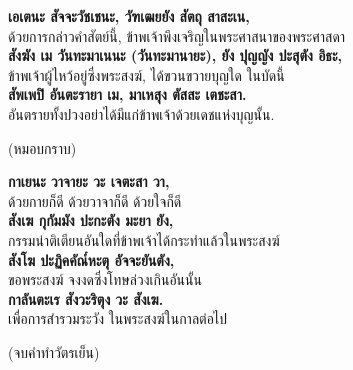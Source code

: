 \documentclass[12pt]{article}
\begin{document}
\textbf{เอเตนะ สัจจะวัชเชนะ, วัฑเฒยยัง สัตถุ สาสะเน,}\\
\indent ด้วยการกล่าวคำสัตย์นี้, ข้าพเจ้าพึงเจริญในพระศาสนาของพระศาสดา\\
\textbf{สังฆัง เม วันทะมาเนนะ (วันทะมานายะ), ยัง ปุญญัง ปะสุตัง อิธะ,}\\
\indent ข้าพเจ้าผู้ไหว้อยู่ซึ่งพระสงฆ์, ได้ขวนขวายบุญใด ในบัดนี้\\
\textbf{สัพเพปิ อันตะรายา เม, มาเหสุง ตัสสะ เตชะสา.}\\
\indent อันตรายทั้งปวงอย่าได้มีแก่ข้าพเจ้าด้วยเดชแห่งบุญนั้น.\\
\begin{center}
(หมอบกราบ)
\end{center}
\textbf{กาเยนะ วาจายะ วะ เจตะสา วา,}\\
\indent ด้วยกายก็ดี ด้วยวาจาก็ดี ด้วยใจก็ดี\\
\textbf{สังเฆ กุกัมมัง ปะกะตัง มะยา ยัง,}\\
\indent กรรมน่าติเตียนอันใดที่ข้าพเจ้าได้กระทำแล้วในพระสงฆ์\\
\textbf{สังโฆ ปะฏิคคัณ๎หะตุ อัจจะยันตัง,}\\
\indent ขอพระสงฆ์ จงงดซึ่งโทษล่วงเกินอันนั้น\\
\textbf{กาลันตะเร สังวะริตุง วะ สังเฆ.}\\
\indent เพื่อการสำรวมระวัง ในพระสงฆ์ในกาลต่อไป\\
\begin{center}
(จบคำทำวัตรเย็น)
\end{center}



\pagebreak
\end{document}
